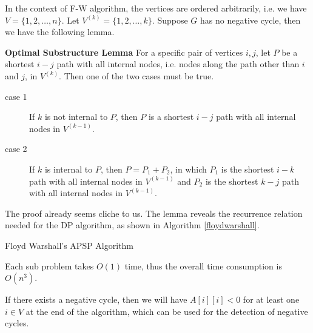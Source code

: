 In the context of F-W algorithm, the vertices are ordered arbitrarily, i.e. we have $V=\{1,2,\dots,n\}$. Let $V^{(k)}=\{1,2,\dots,k\}$. Suppose $G$ has no negative cycle, then we have the following lemma.
\begin{lemma}\textbf{Optimal Substructure Lemma}
For a specific pair of vertices $i,j$, let $P$ be a shortest $i-j$ path with all internal nodes, i.e. nodes along the path other than $i$ and $j$, in $V^{(k)}$. Then one of the two cases must be true.
\begin{description}
\item[case 1]If $k$ is not internal to $P$, then $P$ is a shortest $i-j$ path with all internal nodes in $V^{(k-1)}$.
\item[case 2]If $k$ is internal to $P$, then $P=P_1+P_2$, in which $P_1$ is the shortest $i-k$ path with all internal nodes in $V^{(k-1)}$ and $P_2$ is the shortest $k-j$ path with all internal nodes in $V^{(k-1)}$.
\end{description}
\end{lemma}
The proof already seems cliche to us. The lemma reveals the recurrence relation needed for the DP algorithm, as shown in Algorithm \ref{floydwarshall}.
\begin{algorithm}[ht]
\caption{Floyd Warshall's APSP Algorithm}\label{floydwarshall}
\begin{algorithmic}[1]
\EndFor\EndFor\EndFor
\end{algorithmic}
\end{algorithm}

Each sub problem takes $O(1)$ time, thus the overall time consumption is $O(n^3)$. 

If there exists a negative cycle, then we will have $A[i][i]<0$ for at least one $i\in V$ at the end of the algorithm, which can be used for the detection of negative cycles.

